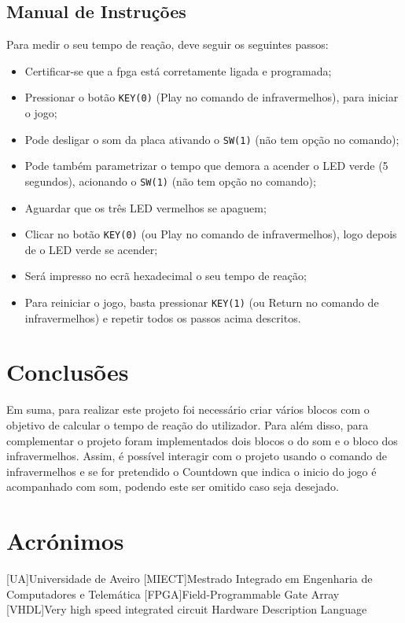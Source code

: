 \documentclass[a4paper,11pt,onecolumn]{report}
\begin{document}
\section{Manual de Instruções}
Para medir o seu tempo de reação, deve seguir os seguintes passos:
\begin{itemize}
\item Certificar-se que a \ac{fpga} está corretamente ligada e programada;
\item Pressionar o botão \texttt{KEY(0)} (Play no comando de infravermelhos), para iniciar o jogo;
\item Pode desligar o som da placa ativando o \texttt{SW(1)} (não tem opção no comando);
\item Pode também parametrizar o tempo que demora a acender o LED verde (5 segundos), acionando o \texttt{SW(1)} (não tem opção no comando);
\item Aguardar que os três LED vermelhos se apaguem;
\item Clicar no botão \texttt{KEY(0)} (ou Play no comando de infravermelhos), logo depois de o LED verde se acender;
\item Será impresso no ecrã hexadecimal o seu tempo de reação;
\item Para reiniciar o jogo, basta pressionar \texttt{KEY(1)} (ou Return no comando de infravermelhos) e repetir todos os passos acima descritos.
\end{itemize}


\chapter{Conclusões}
\label{chap.conclusao}
Em suma, para realizar este projeto foi necessário criar vários blocos com o objetivo de calcular o tempo de reação do utilizador. Para além disso, para complementar o projeto foram implementados dois blocos o do som e o bloco dos infravermelhos. Assim, é possível interagir com o projeto usando o comando de infravermelhos e se for pretendido o Countdown que indica o inicio do jogo é acompanhado com som, podendo este ser omitido caso seja desejado. 


\chapter*{Acrónimos}
\begin{acronym}
[UA]{Universidade de Aveiro}
[MIECT]{Mestrado Integrado em Engenharia de Computadores e Telemática}
[FPGA]{Field-Programmable Gate Array}
[VHDL]{Very high speed integrated circuit Hardware Description Language}

\end{acronym}


\end{document}
